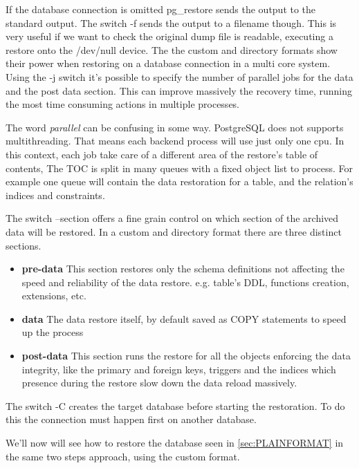 If the database connection is omitted pg\_restore sends the output to the standard output. The 
switch -f sends the output to a filename though. This is very useful if we want to check the 
original dump file is readable, executing a restore onto the /dev/null device.\newline
The the custom and directory formats show their power when restoring on a database 
connection in a multi core system. Using the -j switch it's possible to specify the number of 
parallel jobs for the data and the post data section. This can improve massively the 
recovery time, running the most time consuming actions in multiple processes.\newline

The word \textit{parallel} can be confusing in some way. PostgreSQL does not supports 
multithreading. That means each backend process will use just only one cpu. In this context, each 
job take care of a different area of the restore's table of contents, The TOC is split in 
many queues with a fixed object list to process. For example one queue will contain the data 
restoration for a table, and the relation's indices and constraints.\newline

The switch --section offers a fine grain control on which section of the archived data will be 
restored. In a custom and directory format there are three distinct sections. 
\begin{itemize}
 \item \textbf{pre-data} This section restores only the schema definitions not affecting the speed 
and reliability of the data restore. e.g. table's DDL, functions creation, extensions, etc.
\item  \textbf{data} The data restore itself, by default saved as COPY statements to speed up the 
process
\item  \textbf{post-data} This section runs the restore for all the objects enforcing the data 
integrity, like the primary and foreign keys, triggers and the indices which presence during the 
restore slow down the data reload massively.
\end{itemize}

The switch -C creates the target database before starting the restoration. To do this the 
connection must happen first on another database. \newline

We'll now will see how to restore the database seen in \ref{sec:PLAINFORMAT} in the same two 
steps approach, using the custom format.\newline

